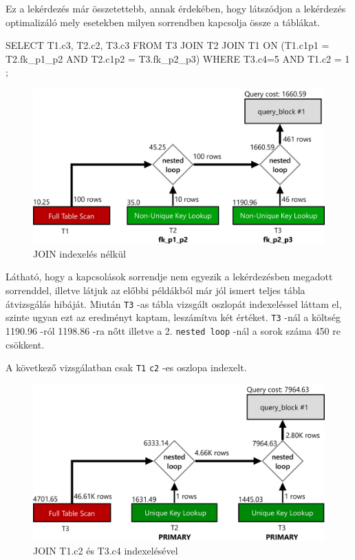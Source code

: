 
Ez a lekérdezés már összetettebb, annak érdekében, hogy látszódjon a lekérdezés optimalizáló mely esetekben milyen sorrendben kapcsolja össze a táblákat.
\begin{python}
SELECT T1.c3, T2.c2, T3.c3 FROM T3 JOIN T2 JOIN T1 
	ON (T1.c1p1 = T2.fk_p1_p2 AND T2.c1p2 = T3.fk_p2_p3) 
	WHERE  T3.c4=5 AND T1.c2 = 1 ;
\end{python}

\begin{figure}[h!]
\centering
\includegraphics[width=14cm]{images/explain/3-1.png}
\caption{JOIN indexelés nélkül}
\label{fig:schema}
\end{figure}

Látható, hogy a kapcsolások sorrendje nem egyezik a lekérdezésben megadott sorrenddel, illetve látjuk az előbbi példákból már jól ismert teljes tábla átvizsgálás hibáját.
Miután \texttt{T3} -as tábla vizsgált oszlopát indexeléssel láttam el, szinte ugyan ezt az eredményt kaptam, leszámítva két értéket. \texttt{T3} -nál a költség 1190.96 -ról 1198.86 -ra nőtt illetve a 2. \texttt{nested loop} -nál a sorok száma 450 re csökkent.

\newpage
A következő vizsgálatban csak \texttt{T1} \texttt{c2} -es oszlopa indexelt.

\begin{figure}[h!]
\centering
\includegraphics[width=14cm]{images/explain/3-2.png}
\caption{JOIN T1.c2 és T3.c4 indexelésével}
\label{fig:schema}
\end{figure}

